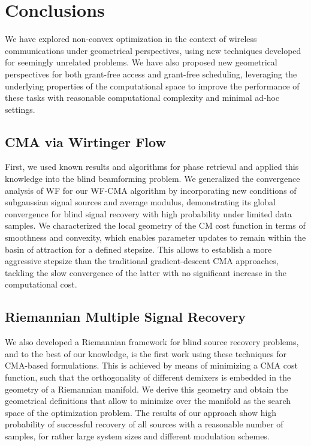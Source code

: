\chapter{Conclusions}
\label{chap:conclusion}

We have explored non-convex optimization in the context of wireless communications under geometrical perspectives, using new techniques developed for seemingly unrelated problems. We have also proposed new geometrical perspectives for both grant-free access and grant-free scheduling, leveraging the underlying properties of the computational space to improve the performance of these tasks with reasonable computational complexity and minimal ad-hoc settings.

\section{CMA via Wirtinger Flow}
First, we used known results and algorithms for phase retrieval and applied this knowledge into the blind beamforming problem. We generalized the convergence analysis of WF for our WF-CMA algorithm by incorporating new conditions of subgaussian signal sources and average modulus, demonstrating its global convergence for blind signal recovery with high probability under limited data samples. 
We characterized the local geometry of the CM cost function in terms of smoothness and convexity, which enables parameter updates to remain within the basin of attraction for a defined stepsize. This allows to establish a more aggressive stepsize than the traditional gradient-descent CMA approaches, tackling the slow convergence of the latter with no significant increase in the computational cost.  


\section{Riemannian Multiple Signal Recovery}
We also developed a Riemannian framework for blind source recovery problems, and to the best of our knowledge, is the first work using these techniques for CMA-based formulations.
This is achieved by means of minimizing a CMA cost function, such that the orthogonality of different demixers is embedded in the geometry of a Riemannian manifold. We derive this geometry and obtain the geometrical definitions that allow to minimize over the manifold as the search space of the optimization problem. The results of our approach show high probability of successful recovery of all sources with a reasonable number of samples, for rather large system sizes and different modulation schemes. 



